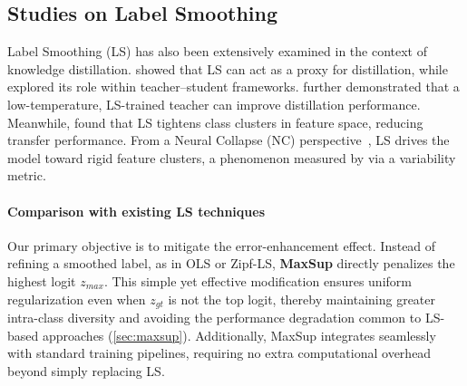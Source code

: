 \subsection{Studies on Label Smoothing}
Label Smoothing (LS) has also been extensively examined in the context of knowledge distillation. \citet{yuan2020revisiting} showed that LS can act as a proxy for distillation, while \citet{shen2021label} explored its role within teacher--student frameworks. \citet{chandrasegaran2022revisiting} further demonstrated that a low-temperature, LS-trained teacher can improve distillation performance. Meanwhile, \citet{kornblith2021better} found that LS tightens class clusters in feature space, reducing transfer performance. From a Neural Collapse (NC) perspective~\citep{zhou2022all, guo2024cross}, LS drives the model toward rigid feature clusters, a phenomenon measured by \citet{xu2023quantifying} via a variability metric.

\paragraph{Comparison with existing LS techniques}  
Our primary objective is to mitigate the error-enhancement effect. Instead of refining a smoothed label, as in OLS or Zipf-LS, \textbf{MaxSup} directly penalizes the highest logit \(z_{\textit{max}}\). This simple yet effective modification ensures uniform regularization even when \(z_{gt}\) is not the top logit, thereby maintaining greater intra-class diversity and avoiding the performance degradation common to LS-based approaches (\cref{sec:maxsup}). Additionally, MaxSup integrates seamlessly with standard training pipelines, requiring no extra computational overhead beyond simply replacing LS.



